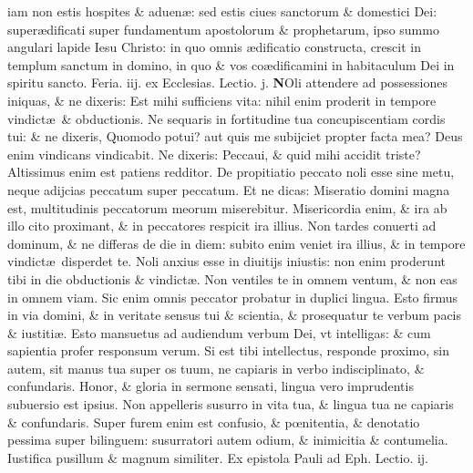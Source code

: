 \documentclass[a5paper,10pt]{book}
\def\leftmarginnote{%
	\lrmarginnote{\hskip -\marginparsep \hskip -6.5em}}
\def\ae{æ}
\def\oe{œ}
\begin{document}
\begin{multicols*}{2}
iam\leftmarginnote{\begin{flushright}D\end{flushright}} non estis hospites \& aduen\ae : sed estis ciues sanctorum \& domestici Dei: super\ae dificati super fundamentum apostolorum \& prophetarum, ipso summo angulari lapide Iesu Christo: in quo omnis \ae dificatio constructa, crescit in templum sanctum in domino, in quo \& vos co\ae dificamini in habitaculum Dei in spiritu sancto.
\newline {} \color{red} \hypertarget{TUE-SECVNDA-VAGAN}{Feria. iij.} ex Ecclesias. Lectio. j. \color{black}
\vspace{-.25em}
\lettrine[lines=2]{\bfseries N}{}Oli\leftmarginnote{\begin{flushright}ca. 5.\end{flushright}} attendere ad possessiones iniquas, \& ne dixeris: Est mihi sufficiens vita: nihil enim proderit in tempore vindict\ae \ \& obductionis.
Ne sequaris in fortitudine tua concupiscentiam cordis tui: \& ne dixeris, Quomodo potui? aut quis me
subijciet propter facta mea?
Deus enim vindicans vindicabit. Ne dixeris: Peccaui, \& quid mihi accidit triste? Altissimus enim est patiens redditor.
De propitiatio peccato noli esse sine metu, neque adijcias peccatum super peccatum.
Et ne dicas: Miseratio domini magna est, multitudinis peccatorum meorum miserebitur. Misericordia enim, \& ira ab illo cito proximant, \& in peccatores respicit ira illius.
Non tardes conuerti ad dominum, \& ne differas de die in diem: subito enim veniet ira illius, \& in tempore vindict\ae \ disperdet te.
Noli anxius esse in diuitijs iniustis: non enim proderunt tibi in die obductionis \& vindict\ae .
Non ventiles te in omnem ventum, \& non eas in omnem viam. Sic enim omnis peccator probatur in duplici lingua. Esto firmus in via domini, \& in veritate sensus tui \& scientia, \& prosequatur te verbum pacis \& iustiti\ae .
Esto mansuetus ad audiendum verbum Dei, vt intelligas: \& cum sapientia profer responsum verum. Si est tibi intellectus, responde proximo, sin autem, sit manus tua super os tuum, ne capiaris in verbo indisciplinato, \& confundaris.
Honor, \& gloria in sermone sensati, lingua vero imprudentis subuersio est ipsius.
Non appelleris susurro in vita tua, \& lingua tua ne capiaris \& confundaris. Super furem enim est confusio, \& p\oe nitentia, \& denotatio pessima super bilinguem: susurratori autem odium, \& inimicitia \& contumelia.
Iustifica pusillum \& magnum similiter.
\newline {} \color{red} Ex epistola Pauli ad Eph. \hfill Lectio. ij. \color{black}

\end{multicols*}
\end{document}
